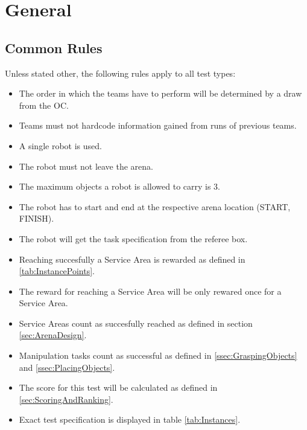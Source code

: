 \label{sec:Tests}

\section{General}

\subsection{Common Rules}
\label{ssec: Common Rules}


Unless stated other, the following rules apply to all test types:

\begin{itemize}
\item The order in which the teams have to perform will be determined by a draw from the OC.
\item Teams must not hardcode information gained from runs of previous teams.
\item A single robot is used.
\item The robot must not leave the arena.
\item The maximum objects a robot is allowed to carry is 3.
\item The robot has to start and end at the respective arena location (START, FINISH).
\item The robot will get the task specification from the referee box.
\item Reaching succesfully a Service Area is rewarded as defined in \ref{tab:InstancePoints}.
\item The reward for reaching a Service Area will be only rewared once for a Service Area.
\item Service Areas count as succesfully reached as defined in section \ref{sec:ArenaDesign}.
\item Manipulation tasks count as successful as defined in \ref{ssec:GraspingObjects} and \ref{ssec:PlacingObjects}.
\item The score for this test will be calculated as defined in \ref{sec:ScoringAndRanking}.
\item Exact test specification is displayed in table \ref{tab:Instances}.
\end{itemize}







